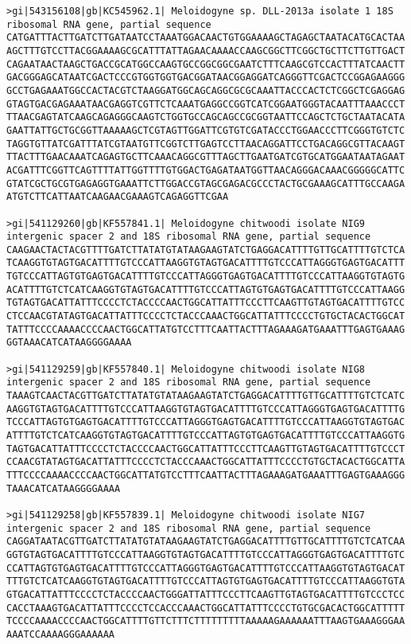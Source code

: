 \documentclass[11pt]{article}
\begin{document}
\begin{Verbatim}[commandchars=\\\{\}]
>gi|543156108|gb|KC545962.1| Meloidogyne sp. DLL-2013a isolate 1 18S ribosomal RNA gene, partial sequence
CATGATTTACTTGATCTTGATAATCCTAAATGGACAACTGTGGAAAAGCTAGAGCTAATACATGCACTAA
AGCTTTGTCCTTACGGAAAAGCGCATTTATTAGAACAAAACCAAGCGGCTTCGGCTGCTTCTTGTTGACT
CAGAATAACTAAGCTGACCGCATGGCCAAGTGCCGGCGGCGAATCTTTCAAGCGTCCACTTTATCAACTT
GACGGGAGCATAATCGACTCCCGTGGTGGTGACGGATAACGGAGGATCAGGGTTCGACTCCGGAGAAGGG
GCCTGAGAAATGGCCACTACGTCTAAGGATGGCAGCAGGCGCGCAAATTACCCACTCTCGGCTCGAGGAG
GTAGTGACGAGAAATAACGAGGTCGTTCTCAAATGAGGCCGGTCATCGGAATGGGTACAATTTAAACCCT
TTAACGAGTATCAAGCAGAGGGCAAGTCTGGTGCCAGCAGCCGCGGTAATTCCAGCTCTGCTAATACATA
GAATTATTGCTGCGGTTAAAAAGCTCGTAGTTGGATTCGTGTCGATACCCTGGAACCCTTCGGGTGTCTC
TAGGTGTTATCGATTTATCGTAATGTTCGGTCTTGAGTCCTTAACAGGATTCCTGACAGGCGTTACAAGT
TTACTTTGAACAAATCAGAGTGCTTCAAACAGGCGTTTAGCTTGAATGATCGTGCATGGAATAATAGAAT
ACGATTTCGGTTCAGTTTTATTGGTTTTGTGGACTGAGATAATGGTTAACAGGGACAAACGGGGGCATTC
GTATCGCTGCGTGAGAGGTGAAATTCTTGGACCGTAGCGAGACGCCCTACTGCGAAAGCATTTGCCAAGA
ATGTCTTCATTAATCAAGAACGAAAGTCAGAGGTTCGAA

>gi|541129260|gb|KF557841.1| Meloidogyne chitwoodi isolate NIG9 intergenic spacer 2 and 18S ribosomal RNA gene, partial sequence
CAAGAACTACTACGTTTTGATCTTATATGTATAAGAAGTATCTGAGGACATTTTGTTGCATTTTGTCTCA
TCAAGGTGTAGTGACATTTTGTCCCATTAAGGTGTAGTGACATTTTGTCCCATTAGGGTGAGTGACATTT
TGTCCCATTAGTGTGAGTGACATTTTGTCCCATTAGGGTGAGTGACATTTTGTCCCATTAAGGTGTAGTG
ACATTTTGTCTCATCAAGGTGTAGTGACATTTTGTCCCATTAGTGTGAGTGACATTTTGTCCCATTAAGG
TGTAGTGACATTATTTCCCCTCTACCCCAACTGGCATTATTTCCCTTCAAGTTGTAGTGACATTTTGTCC
CTCCAACGTATAGTGACATTATTTCCCCTCTACCCAAACTGGCATTATTTCCCCTGTGCTACACTGGCAT
TATTTCCCCAAAACCCCAACTGGCATTATGTCCTTTCAATTACTTTAGAAAGATGAAATTTGAGTGAAAG
GGTAAACATCATAAGGGGAAAA

>gi|541129259|gb|KF557840.1| Meloidogyne chitwoodi isolate NIG8 intergenic spacer 2 and 18S ribosomal RNA gene, partial sequence
TAAAGTCAACTACGTTGATCTTATATGTATAAGAAGTATCTGAGGACATTTTGTTGCATTTTGTCTCATC
AAGGTGTAGTGACATTTTGTCCCATTAAGGTGTAGTGACATTTTGTCCCATTAGGGTGAGTGACATTTTG
TCCCATTAGTGTGAGTGACATTTTGTCCCATTAGGGTGAGTGACATTTTGTCCCATTAAGGTGTAGTGAC
ATTTTGTCTCATCAAGGTGTAGTGACATTTTGTCCCATTAGTGTGAGTGACATTTTGTCCCATTAAGGTG
TAGTGACATTATTTCCCCTCTACCCCAACTGGCATTATTTCCCTTCAAGTTGTAGTGACATTTTGTCCCT
CCAACGTATAGTGACATTATTTCCCCTCTACCCAAACTGGCATTATTTCCCCTGTGCTACACTGGCATTA
TTTCCCCAAAACCCCAACTGGCATTATGTCCTTTCAATTACTTTAGAAAGATGAAATTTGAGTGAAAGGG
TAAACATCATAAGGGGAAAA

>gi|541129258|gb|KF557839.1| Meloidogyne chitwoodi isolate NIG7 intergenic spacer 2 and 18S ribosomal RNA gene, partial sequence
CAGGATAATACGTTGATCTTATATGTATAAGAAGTATCTGAGGACATTTTGTTGCATTTTGTCTCATCAA
GGTGTAGTGACATTTTGTCCCATTAAGGTGTAGTGACATTTTGTCCCATTAGGGTGAGTGACATTTTGTC
CCATTAGTGTGAGTGACATTTTGTCCCATTAGGGTGAGTGACATTTTGTCCCATTAAGGTGTAGTGACAT
TTTGTCTCATCAAGGTGTAGTGACATTTTGTCCCATTAGTGTGAGTGACATTTTGTCCCATTAAGGTGTA
GTGACATTATTTCCCCTCTACCCCAACTGGGATTATTTCCCTTCAAGTTGTAGTGACATTTTGTCCCTCC
CACCTAAAGTGACATTATTTCCCCTCCACCCAAACTGGCATTATTTCCCCTGTGCGACACTGGCATTTTT
TCCCCAAAACCCCAACTGGCATTTTGTTCTTTCTTTTTTTTTAAAAAGAAAAAATTTAAGTGAAAGGGAA
AAATCCAAAAGGGAAAAAA


\end{Verbatim}
\end{document}
